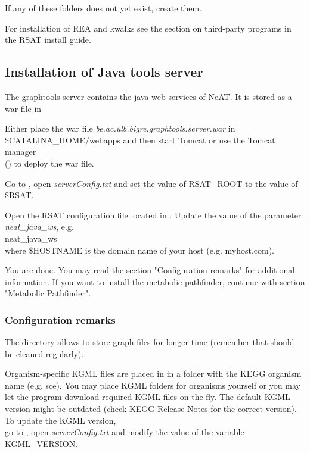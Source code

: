 \documentclass{book}
\begin{document}
If any of these folders does not yet exist, create them.

For installation of REA and kwalks see the section on third-party programs in
the RSAT install guide.

\subsection{Installation of Java tools server}

The graphtools server contains the java web services of NeAT. It is stored as a war file
in 

Either place the war file \textit{be.ac.ulb.bigre.graphtools.server.war} in
\$CATALINA\_HOME/webapps and then start Tomcat or use the Tomcat manager\\
 ()
 to deploy the war file.

Go to , open
\textit{serverConfig.txt} and set the value of RSAT\_ROOT to the value of \$RSAT.

Open the RSAT configuration file
 located in .
Update the value of the parameter \textit{neat\_java\_ws}, e.g.\\
neat\_java\_ws=\\
where \$HOSTNAME is the domain name of your host (e.g. myhost.com).

You are done. You may read the section "Configuration remarks" for additional information.
If you want to install the metabolic pathfinder, continue with section "Metabolic Pathfinder".

\subsubsection{Configuration remarks}

The directory 
allows to store graph files for longer time
(remember that  should be cleaned regularly).

Organism-specific KGML files are placed in 
in a folder with the KEGG organism name (e.g. sce).
You may place KGML folders for organisms yourself or you may let the program download
required KGML files on the fly. The default KGML version might be outdated
(check KEGG Release Notes for the correct version). To update the KGML version,\\
go to , open
\textit{serverConfig.txt} and modify the value of the variable KGML\_VERSION.
\end{document}
